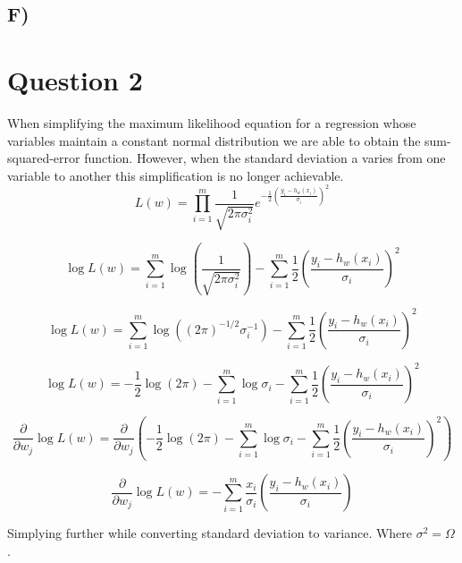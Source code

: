 \documentclass{report}
\begin{document}
\subsection*{F)}

\section*{Question 2}
When simplifying the maximum likelihood equation for a regression whose variables
maintain a constant normal distribution we are able to obtain the sum-squared-error
function. However, when the standard deviation a varies from one variable to another
this simplification is no longer achievable.
  \begin{equation}
     L(w) = \prod_{i=1}^{m} \frac{1}{\sqrt{2\pi\sigma_i^2}}e ^ {-\frac{1}{2}\left(\frac{y_i-h_w(x_i)}{\sigma_i}\right)^2}
  \end{equation}

  \begin{equation}
     \log L(w) = \sum_{i=1}^{m} \log \left(\frac{1}{\sqrt{2\pi\sigma_i^2}}\right)
     - \sum_{i=1}^{m} \frac{1}{2}\left(\frac{y_i-h_w(x_i)}{\sigma_i}\right)^2
  \end{equation}

  \begin{equation}
     \log L(w) = \sum_{i=1}^{m} \log \left((2\pi)^{-1/2}\sigma_i^{-1}\right)
     - \sum_{i=1}^{m} \frac{1}{2}\left(\frac{y_i-h_w(x_i)}{\sigma_i}\right)^2
  \end{equation}

  \begin{equation}
     \log L(w) = -\frac{1}{2} \log(2\pi)
     - \sum_{i=1}^{m} \log \sigma_i
     - \sum_{i=1}^{m} \frac{1}{2}\left(\frac{y_i-h_w(x_i)}{\sigma_i}\right)^2
  \end{equation}

\begin{equation}
     \frac{\partial}{\partial w_j} \log L(w)
     = \frac{\partial}{\partial w_j} \left(-\frac{1}{2} \log(2\pi)
     - \sum_{i=1}^{m} \log \sigma_i
     - \sum_{i=1}^{m} \frac{1}{2}\left(\frac{y_i-h_w(x_i)}{\sigma_i}\right)^2\right)
\end{equation}

\begin{equation}
     \frac{\partial}{\partial w_j} \log L(w) =
     - \sum_{i=1}^{m} \frac{x_i}{\sigma_i}\left(\frac{y_i-h_w(x_i)}{\sigma_i}\right)
\end{equation}

Simplying further while converting standard deviation to variance. Where $\sigma^2 = \Omega$.
\end{document}
